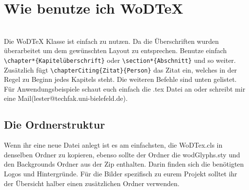 \documentclass[ngerman,LQ,Vampire]{WoDTeX}
\begin{document}
\twocolumn\sloppy
{}
\chapter*{Wie benutze ich WoDTeX}
\\
Die WoDTeX Klasse ist einfach zu nutzen. Da die Überschriften wurden überarbeitet um dem gewünschten Layout zu entsprechen. Benutze einfach \verb|\chapter*{Kapitelüberschrift}| oder \verb|\section*{Abschnitt}| und so weiter. Zusätzlich fügt \verb|\chapterCiting{Zitat}{Person}| das Zitat ein, welches in der Regel zu Beginn jedes Kapitels steht. Die weiteren Befehle sind unten gelistet. Für Anwendungsbeispiele schaut euch einfach die .tex Datei an oder schreibt mir eine Mail(lester@techfak.uni-bielefeld.de).
\section*{Die Ordnerstruktur}
Wenn ihr eine neue Datei anlegt ist es am einfachsten, die WoDTex.cls in denselben Ordner zu kopieren, ebenso sollte der Ordner die wodGlyphs.sty und den Backgrounds Ordner aus der Zip enthalten. Darin finden sich die benötigten Logos und Hintergründe. Für die Bilder spezifisch zu eurem Projekt solltet ihr der Übersicht halber einen zusätzlichen Ordner verwenden.
\end{document}

